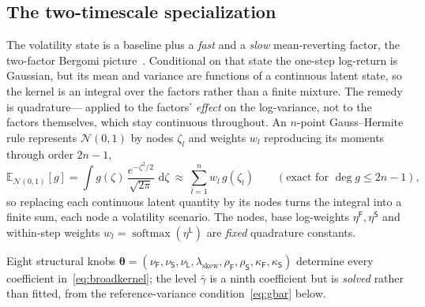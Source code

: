 \documentclass[11pt]{article}
\DeclareMathOperator{\softmax}{softmax}
\newcommand{\E}{\mathbb{E}}
\newcommand{\cN}{\mathcal{N}}
\providecommand{\1}{\mathbf 1}
\newcommand{\dd}{\,\mathrm{d}}
\newcommand{\bth}{{\boldsymbol{\theta}}}
\begin{document}
\subsection{The two-timescale specialization}
\label{sec:twoscale}

The volatility state is a baseline plus a \emph{fast} and a \emph{slow} mean-reverting factor, the
two-factor Bergomi picture~\cite{bergomi2009,bergomi2016}. Conditional on that state the one-step
log-return is Gaussian, but its mean and variance are functions of a continuous latent state, so the
kernel is an integral over the factors rather than a finite mixture. The remedy is quadrature---
applied to the factors' \emph{effect} on the log-variance, not to the factors themselves, which stay
continuous throughout. An $n$-point
Gauss--Hermite rule represents $\cN(0,1)$ by nodes $\zeta_l$ and weights $w_l$ reproducing its
moments through order $2n-1$,
\begin{equation}
\E_{\cN(0,1)}[g]=\int g(\zeta)\,\frac{e^{-\zeta^2/2}}{\sqrt{2\pi}}\,\dd\zeta
   \ \approx\ \sum_{l=1}^{n} w_l\,g(\zeta_l)\qquad(\text{exact for }\deg g\le 2n-1),
\label{eq:gh}
\end{equation}
so replacing each continuous latent quantity by its nodes turns the integral into a finite sum,
each node a volatility scenario. The nodes, base log-weights $\eta^{\mathsf F},\eta^{\mathsf S}$
and within-step weights $w_l=\softmax(\eta^{\mathsf L})$ are \emph{fixed} quadrature constants.

Eight structural knobs
$\bth=(\nu_{\mathsf{F}},\nu_{\mathsf{S}},\nu_{\mathsf{L}},\lambda_{\mathrm{skew}},
\rho_{\mathsf{F}},\rho_{\mathsf{S}},\kappa_{\mathsf{F}},\kappa_{\mathsf{S}})$ determine every
coefficient in~\eqref{eq:broadkernel}; the level $\bar\gamma$ is a ninth coefficient but is
\emph{solved} rather than fitted, from the reference-variance condition~\eqref{eq:gbar} below.
\end{document}
